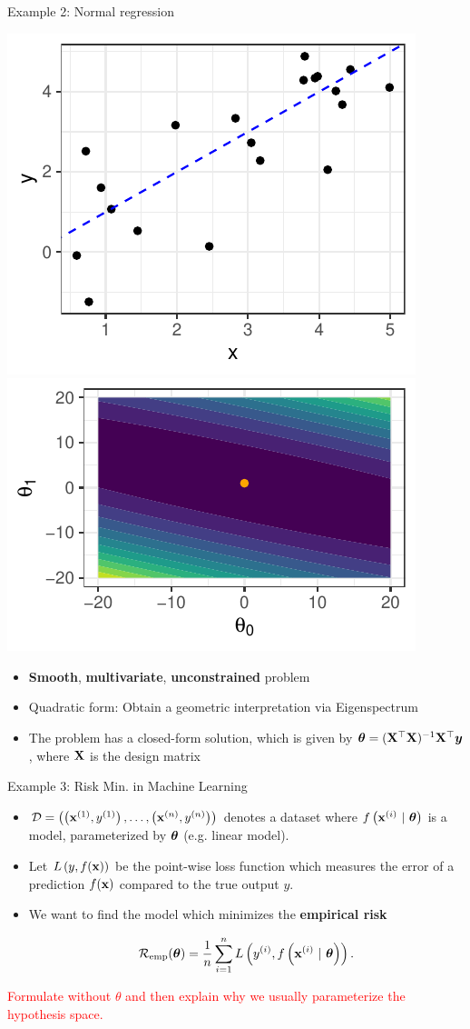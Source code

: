 \begin{vbframe}{Example 2: Normal regression}

\begin{center}
	\includegraphics[height=0.30\textwidth, keepaspectratio]{figure_man/ml_linreg_example_1.pdf} ~~ \includegraphics[height=0.30\textwidth, keepaspectratio]{figure_man/ml_linreg_example_2.pdf}
\end{center}

\begin{itemize}
	\item \textbf{Smooth}, \textbf{multivariate}, \textbf{unconstrained} problem
	\item Quadratic form: Obtain a geometric interpretation via Eigenspectrum
	\item The problem has a closed-form solution, which is given by $\bm{\theta} = (\mathbf{X}^\top \mathbf{X})^{-1}\mathbf{X}^\top \bm{y}$, where $\mathbf{X}$ is the design matrix
\end{itemize}

\end{vbframe}

\begin{frame}{Example 3: Risk Min. in Machine Learning}
	
	
\begin{itemize}
	\item $\mathcal{D} = \left( \left(\mathbf{x}^{(1)}, y^{(1)}\right), \ldots, \left(\mathbf{x}^{(n)}, y^{(n)}\right)\right)$ denotes a dataset 
	where $f\left(\mathbf{x}^{(i)} ~|~ \bm{\theta}\right)$ is a model, parameterized by $\bm{\theta}$ (e.g. linear model).
	\item Let $L\left(y, f(\mathbf{x})\right)$ be the point-wise loss function which measures the error of a prediction $f(\mathbf{x})$ compared to the true output $y$.
	\item We want to find the model which minimizes the \textbf{empirical risk}
	
	$$
	\mathcal{R}_{\text{emp}}(\bm{\theta}) = \frac{1}{n} \sum\limits_{i=1}^n L\left(y^{(i)}, f\left(\mathbf{x}^{(i)} ~|~ \bm{\theta}\right)\right).
	$$
\end{itemize}

\textcolor{red}{Formulate without $\theta$ and then explain why we usually parameterize the hypothesis space. }

\end{frame}	

